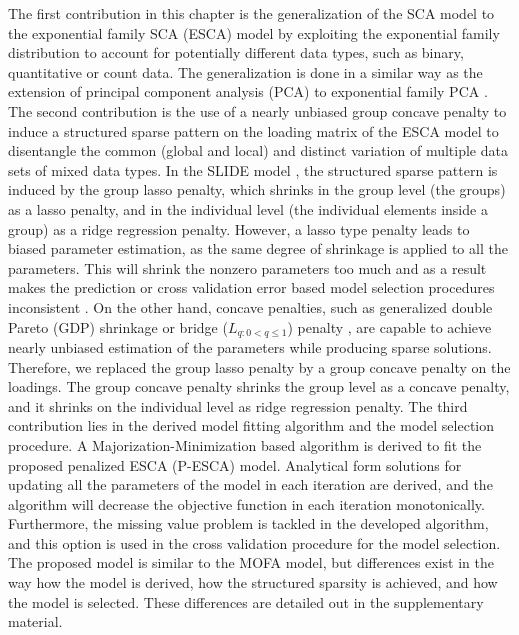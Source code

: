 The first contribution in this chapter is the generalization of the SCA model to the exponential family SCA (ESCA) model by exploiting the exponential family distribution to account for potentially different data types, such as binary, quantitative or count data. The generalization is done in a similar way as the extension of principal component analysis (PCA) to exponential family PCA \cite{collins2002generalization}. The second contribution is the use of a nearly unbiased group concave penalty to induce a structured sparse pattern on the loading matrix of the ESCA model to disentangle the common (global and local) and distinct variation of multiple data sets of mixed data types. In the SLIDE model \cite{gaynanova2017structural}, the structured sparse pattern is induced by the group lasso penalty, which shrinks in the group level (the groups) as a lasso penalty, and in the individual level (the individual elements inside a group) as a ridge regression penalty. However, a lasso type penalty leads to biased parameter estimation, as the same degree of shrinkage is applied to all the parameters. This will shrink the nonzero parameters too much and as a result makes the prediction or cross validation error based model selection procedures inconsistent \cite{meinshausen2006high,leng2006note}. On the other hand, concave penalties, such as generalized double Pareto (GDP) shrinkage \cite{armagan2013generalized} or bridge ($L_{q: 0<q \leq 1}$) penalty \cite{fu1998penalized}, are capable to achieve nearly unbiased estimation of the parameters while producing sparse solutions. Therefore, we replaced the group lasso penalty by a group concave penalty on the loadings. The group concave penalty shrinks the group level as a concave penalty, and it shrinks on the individual level as ridge regression penalty. The third contribution lies in the derived model fitting algorithm and the model selection procedure. A Majorization-Minimization based algorithm is derived to fit the proposed penalized ESCA (P-ESCA) model. Analytical form solutions for updating all the parameters of the model in each iteration are derived, and the algorithm will decrease the objective function in each iteration monotonically. Furthermore, the missing value problem is tackled in the developed algorithm, and this option is used in the cross validation procedure for the model selection. The proposed model is similar to the MOFA model, but differences exist in the way how the model is derived, how the structured sparsity is achieved, and how the model is selected. These differences are detailed out in the supplementary material.

